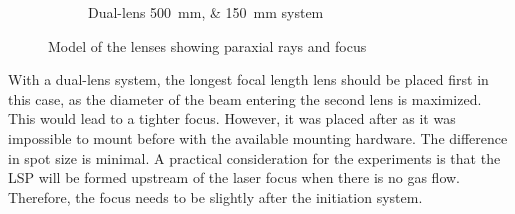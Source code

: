 \begin{figure}[!ht]
\begin{subfigure}[t]{0.45\textwidth}
                    \caption{Dual-lens \qtylist{500;150}{mm} system}
                \end{subfigure}
                \caption{Model of the lenses showing paraxial rays and focus}
                \label{fig:modeled lenses}
            \end{figure}

            With a dual-lens system, the longest focal length lens should be placed first in this case, as the diameter of the beam entering the second lens is maximized. This would lead to a tighter focus. However, it was placed after as it was impossible to mount before with the available mounting hardware. The difference in spot size is minimal. A practical consideration for the experiments is that the LSP will be formed upstream of the laser focus when there is no gas flow. Therefore, the focus needs to be slightly after the initiation system.

